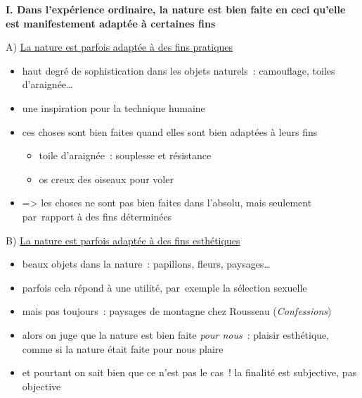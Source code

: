 \documentclass[a4paper,12pt]{report}
\begin{document}
\bigskip

\textbf{I. Dans l'expérience ordinaire, la nature est bien faite en ceci
qu'elle est manifestement adaptée à certaines fins}


\medskip

A) \uline{La nature est parfois adaptée à des fins pratiques}
\begin{itemize}
\item haut degré de sophistication dans les objets naturels : camouflage,
toiles d'araignée\ldots{}
\item une inspiration pour la technique humaine
\item ces choses sont bien faites quand elles sont bien adaptées à leurs
fins
\begin{itemize}
\item toile d'araignée : souplesse et résistance
\item os creux des oiseaux pour voler
\end{itemize}
\item => les choses ne sont pas bien faites dans l'absolu, mais seulement
par rapport à des fins déterminées
\end{itemize}

\medskip

B) \uline{La nature est parfois adaptée à des fins esthétiques}
\begin{itemize}
\item beaux objets dans la nature : papillons, fleurs, paysages\ldots{}
\item parfois cela répond à une utilité, par exemple la sélection sexuelle
\item mais pas toujours : paysages de montagne chez Rousseau (\emph{Confessions}​)
\item alors on juge que la nature est bien faite \emph{pour nous} : plaisir
esthétique, comme si la nature était faite pour nous plaire
\item et pourtant on sait bien que ce n'est pas le cas ! la finalité est
subjective, pas objective
\end{itemize}

\medskip
\end{document}
